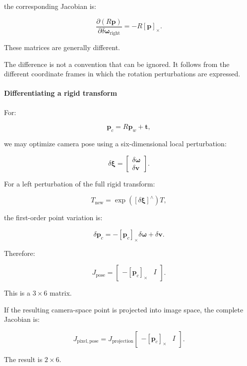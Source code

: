 the corresponding Jacobian is:

\[
\boxed{ \frac{\partial(R\mathbf p)} {\partial\delta\boldsymbol\omega_{\mathrm{right}}} = -R[\mathbf p]_\times }.
\]

These matrices are generally different.

The difference is not a convention that can be ignored. It follows from the different coordinate frames in which the rotation perturbations are expressed.

\paragraph{Differentiating a rigid transform}\label{02-foundations-ii-ch027-differentiating-a-rigid-transform}

\hypertarget{02-foundations-ii-ch027-differentiating-a-rigid-transform}{}

For:

\[
\mathbf p_c=R\mathbf p_w+\mathbf t,
\]

we may optimize camera pose using a six-dimensional local perturbation:

\[
\delta\boldsymbol\xi= \begin{bmatrix} \delta\boldsymbol\omega\\ \delta\mathbf v \end{bmatrix}.
\]

For a left perturbation of the full rigid transform:

\[
T_{\mathrm{new}}= \exp([\delta\boldsymbol\xi]^\wedge)T,
\]

the first-order point variation is:

\[
\delta\mathbf p_c = -[\mathbf p_c]_\times\delta\boldsymbol\omega +\delta\mathbf v.
\]

Therefore:

\[
\boxed{ J_{\mathrm{pose}} = \begin{bmatrix} -[\mathbf p_c]_\times&I \end{bmatrix} }.
\]

This is a \(3\times6\) matrix.

If the resulting camera-space point is projected into image space, the complete Jacobian is:

\[
\boxed{ J_{\mathrm{pixel,pose}} = J_{\mathrm{projection}} \begin{bmatrix} -[\mathbf p_c]_\times&I \end{bmatrix} }.
\]

The result is \(2\times6\).

